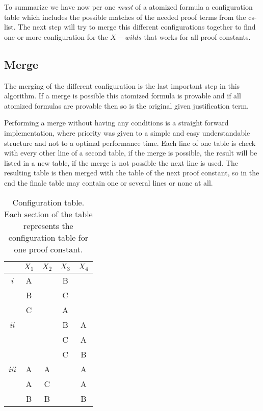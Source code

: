 \par
To summarize we have now per one \emph{must} of a atomized formula a configuration table which includes the possible matches of the needed proof terms from the cs-list. The next step will try to merge this different configurations together to find one or more configuration for the $X-wilds$ that works for all proof constants.

\subsection{Merge}
The merging of the different configuration is the last important step in this algorithm. If a merge is possible this atomized formula is provable and if all atomized formulas are provable then so is the original given justification term.

Performing a merge without having any conditions is a straight forward implementation, where priority was given to a simple and easy understandable structure and not to a optimal performance time. Each line of one table is check with every other line of a second table, if the merge is possible, the result will be listed in a new table, if the merge is not possible the next line is used. The resulting table is then merged with the table of the next proof constant, so in the end the finale table may contain one or several lines or none at all. 

\vspace{0.2cm}
\begin{table}[ht]
\centering
\begin{tabular}{ c c c c c }
	 & $X_1$ & $X_2$ & $X_3$ & $X_4$\\
 	\hline
 	\emph{i}  	& A 	& 		& B 	& \\
 				& B 	&		& C 	& \\
 				& C 	& 		& A 	& \\
 	\hline
 	\emph{ii}  	& 		&		& B 	& A\\
 				& 	 	&		& C 	& A\\
 				&		&		& C 	& B\\
  	\hline
  	\emph{iii}	& A 	& A 	& 		& A\\
 	  			& A 	& C 	& 		& A\\
 	  			& B 	& B		&		& B\\

 	\hline 
\end{tabular}
\caption{Configuration table. Each section of the table represents the configuration table for one proof constant.}
\end{table}

